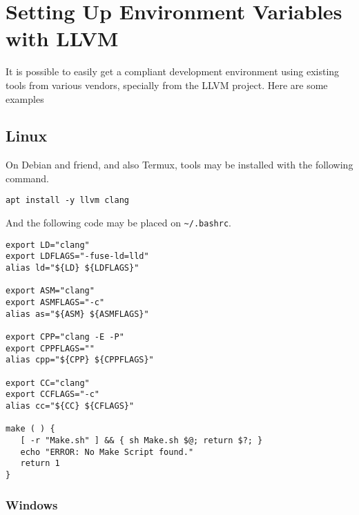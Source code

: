\chapter{Setting Up Environment Variables with LLVM}

It is possible to easily get a compliant development environment
using existing tools from various vendors,
specially from the LLVM \cite{LLVM} project.
Here are some examples

\section{Linux}

On Debian and friend, and also Termux,
tools may be installed with the following command.

\begin{lstlisting}[style=sh]
apt install -y llvm clang
\end{lstlisting}

And the following code may be placed on \texttt{\textasciitilde/.bashrc}.

\begin{lstlisting}[style=sh]
export LD="clang"
export LDFLAGS="-fuse-ld=lld"
alias ld="${LD} ${LDFLAGS}"

export ASM="clang"
export ASMFLAGS="-c"
alias as="${ASM} ${ASMFLAGS}"

export CPP="clang -E -P"
export CPPFLAGS=""
alias cpp="${CPP} ${CPPFLAGS}"

export CC="clang"
export CCFLAGS="-c"
alias cc="${CC} ${CFLAGS}"

make ( ) {
   [ -r "Make.sh" ] && { sh Make.sh $@; return $?; }
   echo "ERROR: No Make Script found."
   return 1
}
\end{lstlisting}

\subsection{Windows}
